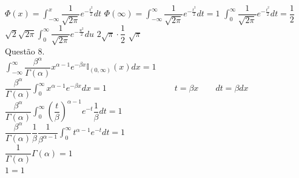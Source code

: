 \documentclass[12pt]{article}
\begin{document}
$\Phi(x)=\displaystyle\int_{-\infty}^{x}\dfrac{1}{\sqrt{2\pi}}e^{-\frac{t^2}{2}}dt$\qquad\qquad
$\Phi(\infty)=\displaystyle\int_{-\infty}^{\infty}\dfrac{1}{\sqrt{2\pi}}e^{-\frac{t^2}{2}}dt=1$\qquad\qquad
$\displaystyle\int_{0}^{\infty}\dfrac{1}{\sqrt{2\pi}}e^{-\frac{t^2}{2}}dt=\dfrac{1}{2}$\\

$\sqrt{2}\sqrt{2\pi}\displaystyle\int_{0}^{\infty}\dfrac{1}{\sqrt{2\pi}}e^{-\frac{u^2}{2}}du$\qquad\qquad
$2\sqrt{\pi}\cdot \dfrac{1}{2}$\qquad\qquad
$\sqrt{\pi}$\\

\noindent Questão 8.\\

$\displaystyle\int_{-\infty}^{\infty}\dfrac{\beta^{\alpha}}{\Gamma(\alpha)}x^{\alpha -1}e^{-\beta x}\mathds{I}_{(0,\infty)}(x)dx=1$\\

$\dfrac{\beta^{\alpha}}{\Gamma(\alpha)}\displaystyle\int_{0}^{\infty}x^{\alpha -1}e^{-\beta x}dx=1\qquad\qquad\qquad\qquad t=\beta x\qquad dt=\beta dx$\\

$\dfrac{\beta^{\alpha}}{\Gamma(\alpha)}\displaystyle\int_{0}^{\infty}\left(\dfrac{t}{\beta}\right)^{\alpha -1}e^{-t}\dfrac{1}{\beta}dt=1$\\

$\dfrac{\beta^{\alpha}}{\Gamma(\alpha)}\dfrac{1}{\beta}\dfrac{1}{\beta^{\alpha -1}}\displaystyle\int_{0}^{\infty}t^{\alpha -1}e^{-t}dt=1$\\

$\dfrac{1}{\Gamma(\alpha)}\Gamma(\alpha)=1$\\

$1=1$\\
\end{document}
